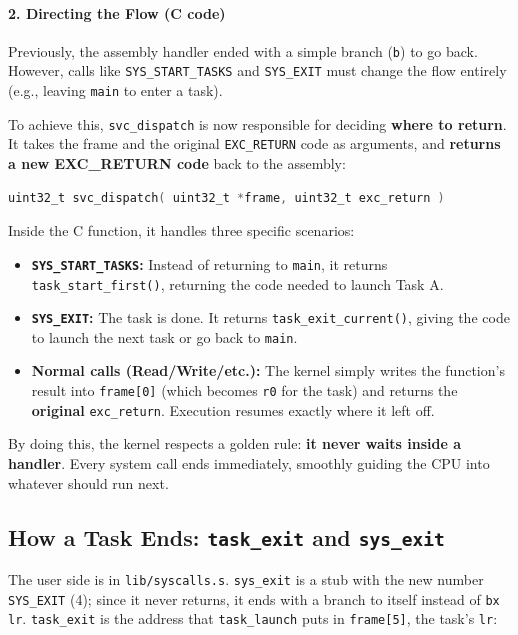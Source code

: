 \paragraph*{2. Directing the Flow (C code)}
Previously, the assembly handler ended with a simple branch (\texttt{b}) to go back. However, calls like \texttt{SYS\_START\_TASKS} and \texttt{SYS\_EXIT} must change the flow entirely (e.g., leaving \texttt{main} to enter a task). 

To achieve this, \texttt{svc\_dispatch} is now responsible for deciding \textbf{where to return}. It takes the frame and the original \texttt{EXC\_RETURN} code as arguments, and \textbf{returns a new EXC\_RETURN code} back to the assembly:

\begin{lstlisting}[language=C]
uint32_t svc_dispatch( uint32_t *frame, uint32_t exc_return )
\end{lstlisting}

Inside the C function, it handles three specific scenarios:
\begin{itemize}
    \item \textbf{\texttt{SYS\_START\_TASKS}:} Instead of returning to \texttt{main}, it returns \texttt{task\_start\_first()}, returning the code needed to launch Task A.
    \item \textbf{\texttt{SYS\_EXIT}:} The task is done. It returns \texttt{task\_exit\_current()}, giving the code to launch the next task or go back to \texttt{main}.
    \item \textbf{Normal calls (Read/Write/etc.):} The kernel simply writes the function's result into \texttt{frame[0]} (which becomes \texttt{r0} for the task) and returns the \textbf{original} \texttt{exc\_return}. Execution resumes exactly where it left off.
\end{itemize}

By doing this, the kernel respects a golden rule: \textbf{it never waits inside a handler}. Every system call ends immediately, smoothly guiding the CPU into whatever should run next.

\subsection{How a Task Ends: \texttt{task\_exit} and \texttt{sys\_exit}}

The user side is in \texttt{lib/syscalls.s}. \texttt{sys\_exit} is a stub with the new number \texttt{SYS\_EXIT} (4); since it never returns, it ends with a branch to itself instead of \texttt{bx lr}. \texttt{task\_exit} is the address that \texttt{task\_launch} puts in \texttt{frame[5]}, the task's \texttt{lr}:

